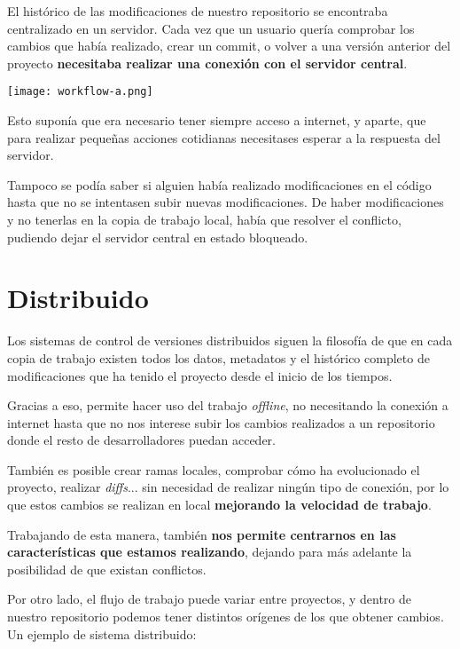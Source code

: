 El histórico de las modificaciones de nuestro repositorio se encontraba centralizado en un servidor. Cada vez que un usuario quería comprobar los cambios que había realizado, crear un commit, o volver a una versión anterior del proyecto \textbf{necesitaba realizar una conexión con el servidor central}.

\begin{center}
    \texttt{[image: workflow-a.png]}
\end{center}

Esto suponía que era necesario tener siempre acceso a internet, y aparte, que para realizar pequeñas acciones cotidianas necesitases esperar a la respuesta del servidor.

Tampoco se podía saber si alguien había realizado modificaciones en el código hasta que no se intentasen subir nuevas modificaciones. De haber modificaciones y no tenerlas en la copia de trabajo local, había que resolver el conflicto, pudiendo dejar el servidor central en estado bloqueado.


\section{Distribuido}
Los sistemas de control de versiones distribuidos siguen la filosofía de que en cada copia de trabajo existen todos los datos, metadatos y el histórico completo de modificaciones que ha tenido el proyecto desde el inicio de los tiempos.

Gracias a eso, permite hacer uso del trabajo \textit{offline}, no necesitando la conexión a internet hasta que no nos interese subir los cambios realizados a un repositorio donde el resto de desarrolladores puedan acceder.

También es posible crear ramas locales, comprobar cómo ha evolucionado el proyecto, realizar \textit{diffs}... sin necesidad de realizar ningún tipo de conexión, por lo que estos cambios se realizan en local \textbf{mejorando la velocidad de trabajo}.

Trabajando de esta manera, también \textbf{nos permite centrarnos en las características que estamos realizando}, dejando para más adelante la posibilidad de que existan conflictos.

Por otro lado, el flujo de trabajo puede variar entre proyectos, y dentro de nuestro repositorio podemos tener distintos orígenes de los que obtener cambios. Un ejemplo de sistema distribuido:

